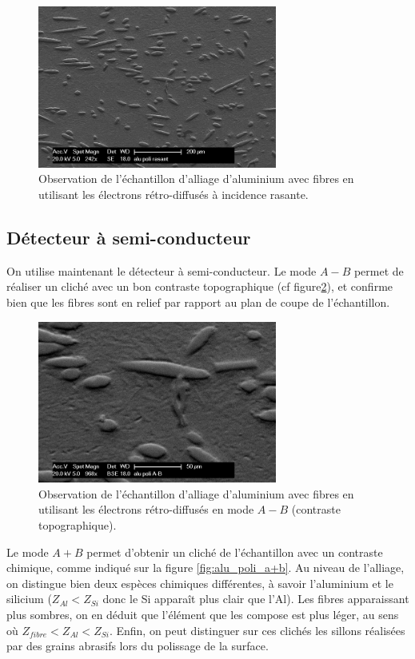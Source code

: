 \documentclass[a4paper,12pt]{article}
\begin{document}
\begin{figure}
\centering
\includegraphics[width=0.7\textwidth]{images/alu_er_rasant.png}
\caption{Observation de l'échantillon d'alliage d'aluminium avec fibres en utilisant les électrons rétro-diffusés à incidence rasante.}
\label{fig:alu_poli_er_rasant}
\end{figure}

\subsection{Détecteur à semi-conducteur}

On utilise maintenant le détecteur à semi-conducteur.
Le mode $A-B$ permet de réaliser un cliché avec un bon contraste topographique (cf figure\ref{fig:alu_poli_a-b}), et confirme bien que les fibres sont en relief par rapport au plan de coupe de l'échantillon.

\begin{figure}
\centering
\includegraphics[width=0.7\textwidth]{images/alu_er_amb.png}
\caption{Observation de l'échantillon d'alliage d'aluminium avec fibres en utilisant les électrons rétro-diffusés en mode $A-B$ (contraste topographique).}
\label{fig:alu_poli_a-b}
\end{figure}

Le mode $A+B$ permet d'obtenir un cliché de l'échantillon avec un contraste chimique, comme indiqué sur la figure \ref{fig:alu_poli_a+b}.
Au niveau de l'alliage, on distingue bien deux espèces chimiques différentes, à savoir l'aluminium et le silicium ($Z_{Al}<Z_{Si}$ donc le Si apparaît plus clair que l'Al).
Les fibres apparaissant plus sombres, on en déduit que l'élément que les compose est plus léger, au sens où $Z_{fibre}<Z_{Al}<Z_{Si}$.
Enfin, on peut distinguer sur ces clichés les sillons réalisées par des grains abrasifs lors du polissage de la surface.
\end{document}
